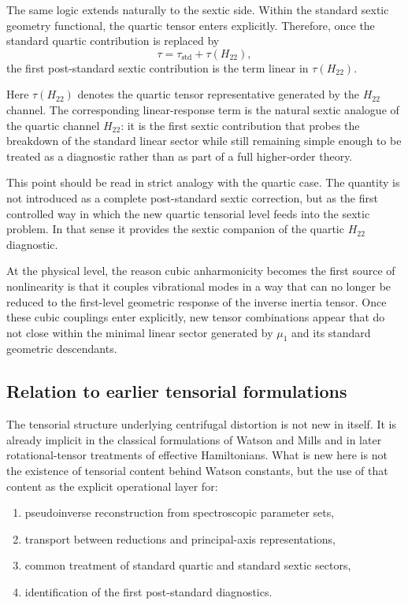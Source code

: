 \documentclass[journal=jacsat,manuscript=article]{achemso}
\begin{document}
The same logic extends naturally to the sextic side. Within the
standard sextic geometry functional, the quartic tensor enters
explicitly. Therefore, once the standard quartic contribution is
replaced by
\begin{equation}
\tau = \tau_{\mathrm{std}} + \tau(H_{22}),
\end{equation}
the first post-standard sextic contribution is the term linear in
$\tau(H_{22})$.

Here $\tau(H_{22})$ denotes the quartic tensor representative
generated by the $H_{22}$ channel. The corresponding linear-response
term is the natural sextic analogue of the quartic channel $H_{22}$:
it is the first sextic contribution that probes the breakdown of the
standard linear sector while still remaining simple enough to be
treated as a diagnostic rather than as part of a full higher-order
theory.

This point should be read in strict analogy with the quartic case.
The quantity is not introduced as a complete post-standard sextic
correction, but as the first controlled way in which the new quartic
tensorial level feeds into the sextic problem. In that sense it
provides the sextic companion of the quartic $H_{22}$ diagnostic.

At the physical level, the reason cubic anharmonicity becomes the first
source of nonlinearity is that it couples vibrational modes in a way
that can no longer be reduced to the first-level geometric response of
the inverse inertia tensor. Once these cubic couplings enter
explicitly, new tensor combinations appear that do not close within the
minimal linear sector generated by $\mu_1$ and its standard geometric
descendants.

\subsection{Relation to earlier tensorial formulations}

The tensorial structure underlying centrifugal distortion is not new
in itself. It is already implicit in the classical formulations of
Watson and Mills and in later rotational-tensor treatments of
effective Hamiltonians.\cite{Watson1968,Watson1977,Mills1972,Kirschner1983}
What is new here is not the existence of
tensorial content behind Watson constants, but the use of that content
as the explicit operational layer for:
\begin{enumerate}
\item pseudoinverse reconstruction from spectroscopic parameter sets,
\item transport between reductions and principal-axis representations,
\item common treatment of standard quartic and standard sextic sectors,
\item identification of the first post-standard diagnostics.
\end{enumerate}
\end{document}
